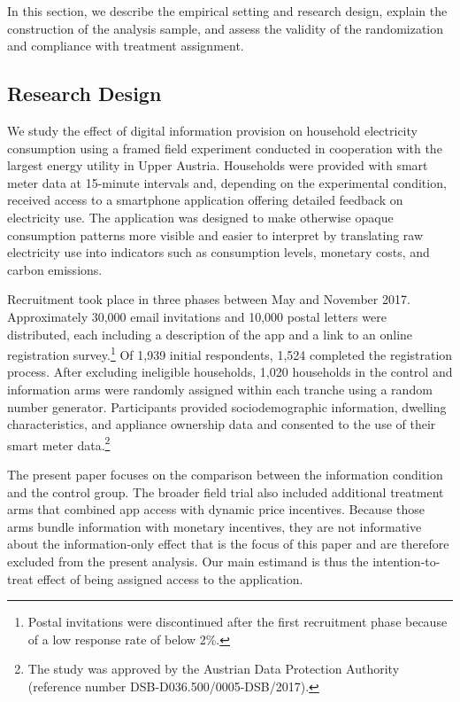 In this section, we describe the empirical setting and research design, explain the construction of the analysis sample, and assess the validity of the randomization and compliance with treatment assignment.

\subsection{Research Design}

We study the effect of digital information provision on household electricity consumption using a framed field experiment \citep{listWhyEconomistsShould2011} conducted in cooperation with the largest energy utility in Upper Austria. Households were provided with smart meter data at 15-minute intervals and, depending on the experimental condition, received access to a smartphone application offering detailed feedback on electricity use. The application was designed to make otherwise opaque consumption patterns more visible and easier to interpret by translating raw electricity use into indicators such as consumption levels, monetary costs, and carbon emissions.

Recruitment took place in three phases between May and November 2017. Approximately 30,000 email invitations and 10,000 postal letters were distributed, each including a description of the app and a link to an online registration survey.\footnote{Postal invitations were discontinued after the first recruitment phase because of a low response rate of below 2\%.} Of 1,939 initial respondents, 1,524 completed the registration process. After excluding ineligible households, 1,020 households in the control and information arms were randomly assigned within each tranche using a random number generator. Participants provided sociodemographic information, dwelling characteristics, and appliance ownership data and consented to the use of their smart meter data.\footnote{The study was approved by the Austrian Data Protection Authority (reference number DSB-D036.500/0005-DSB/2017).}

The present paper focuses on the comparison between the information condition and the control group. The broader field trial also included additional treatment arms that combined app access with dynamic price incentives. Because those arms bundle information with monetary incentives, they are not informative about the information-only effect that is the focus of this paper and are therefore excluded from the present analysis. Our main estimand is thus the intention-to-treat effect of being assigned access to the application.

